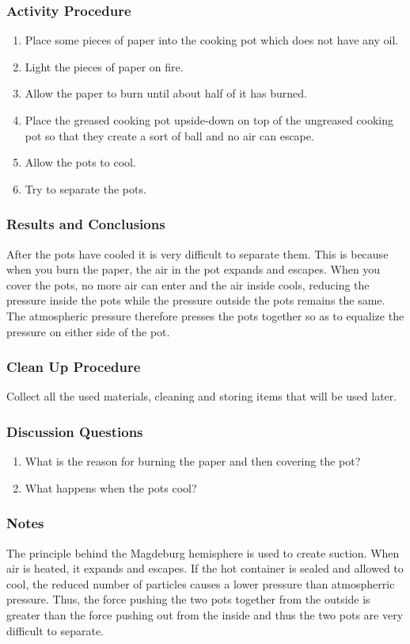 \subsubsection*{Activity Procedure}
\begin{enumerate}
\item{Place some pieces of paper into the cooking pot which does not have any oil.} 
\item{Light the pieces of paper on fire.} 
\item{Allow the paper to burn until about half of it has burned.} 
\item{Place the greased cooking pot upside-down on top of the ungreased cooking pot so that they create a sort of ball and no air can escape.} 
\item{Allow the pots to cool.} 
\item{Try to separate the pots.} 
\end{enumerate}

\subsubsection*{Results and Conclusions}
After the pots have cooled it is very difficult to separate them. This is because when you burn the paper, the air in the pot expands and escapes. When you cover the pots, no more air can enter and the air inside cools, reducing the pressure inside the pots while the pressure outside the pots remains the same. The atmospheric pressure therefore presses the pots together so as to equalize the pressure on either side of the pot. 



\subsubsection*{Clean Up Procedure}
Collect all the used materials, cleaning and storing items that will be used later.

\subsubsection*{Discussion Questions}
\begin{enumerate}
\item{What is the reason for burning the paper and then covering the pot?}
\item{What happens when the pots cool?}
\end{enumerate}

\subsubsection*{Notes}
The principle behind the Magdeburg hemisphere is used to create suction. When air is heated, it expands and escapes. If the hot container is sealed and allowed to cool, the reduced number of particles causes a lower pressure than atmospherric pressure. Thus, the force pushing the two pots together from the outside is greater than the force pushing out from the inside and thus the two pots are very difficult to separate. 


